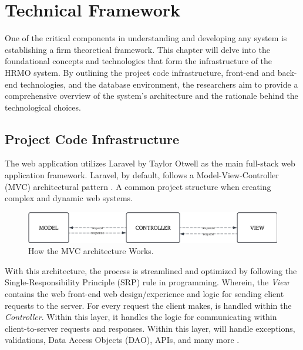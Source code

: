 \chapter{Technical Framework} 

One of the critical components in understanding and developing any system is establishing a firm theoretical framework. This chapter will delve into the foundational concepts and technologies that form the infrastructure of the HRMO system. By outlining the project code infrastructure, front-end and back-end technologies, and the database environment, the researchers aim to provide a comprehensive overview of the system's architecture and the rationale behind the technological choices. 

\section{Project Code Infrastructure}

    The web application utilizes Laravel by Taylor Otwell as the main full-stack web application framework. Laravel, by default, follows a Model-View-Controller (MVC) architectural pattern \cite{medium12023}. A common project structure when creating complex and dynamic web systems. 
    
    \begin{figure}[H]
        \centering
        \includegraphics[width=1\linewidth]{figures/images/mvc.png}
        \caption{How the MVC architecture Works.}
        \label{fig:enter-label}
    \end{figure}
    
    With this architecture, the process is streamlined and optimized by following the Single-Responsibility Principle (SRP) rule in programming. Wherein, the \textit{View} contains the web front-end web design/experience and logic for sending client requests to the server. For every request the client makes, is handled within the \textit{Controller}. Within this layer, it handles the logic for communicating within client-to-server requests and responses. Within this layer, will handle exceptions, validations, Data Access Objects (DAO), APIs, and many more \cite{mdn12023}.
    
